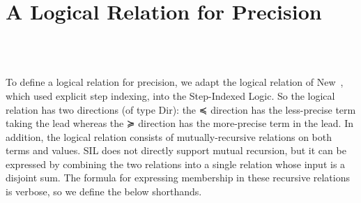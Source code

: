 \section{A Logical Relation for Precision}
\label{sec:log-rel}

\begin{code}[hide]%
\>[0]\AgdaSpace{}%
\AgdaSpace{}%
\AgdaSymbol{:}\AgdaSpace{}%
\AgdaSpace{}%
\<%
\\
\>[0][@{}l@{\AgdaIndent{0}}]%
\>[2]\AgdaSpace{}%
\AgdaSymbol{:}\AgdaSpace{}%
\<%
\\
%
\>[2]\AgdaSpace{}%
\AgdaSymbol{:}\AgdaSpace{}%
\<%
\end{code}

To define a logical relation for precision, we adapt the logical
relation of New~\cite{New:2020ab}, which used explicit step indexing,
into the Step-Indexed Logic. So the logical relation has two
directions (of type \textsf{Dir}): the ≼ direction has the
less-precise term taking the lead whereas the ≽ direction has the
more-precise term in the lead.
%
In addition, the logical relation consists of mutually-recursive
relations on both terms and values. SIL does not directly support
mutual recursion, but it can be expressed by combining the two
relations into a single relation whose input is a disjoint sum.  The
formula for expressing membership in these recursive relations is
verbose, so we define the below shorthands.

